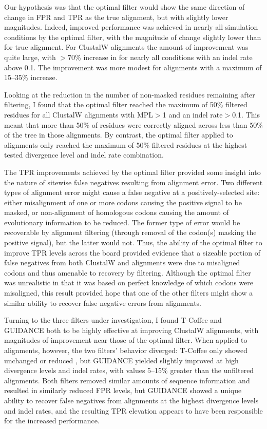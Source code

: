 Our hypothesis was that the optimal filter would show the same
direction of change in FPR and TPR as the true alignment, but with
slightly lower magnitudes. Indeed, improved \sw performance was
achieved in nearly all simulation conditions by the optimal filter,
with the magnitude of \tpr change slightly lower than for true
alignment. For ClustalW alignments the amount of improvement was quite
large, with $>$70\% increase in \tpr for nearly all conditions with an
indel rate above 0.1. The improvement was more modest for \prankc
alignments with a maximum of 15--35\% \tpr increase.

Looking at the reduction in the number of non-masked residues
remaining after filtering, I found that the optimal filter reached
the maximum of 50\% filtered residues for all ClustalW alignments with
MPL$>$1 and an indel rate$>$0.1. This meant that more than 50\% of
residues were correctly aligned across less than 50\% of the tree in
those alignments. By contrast, the optimal filter applied to \prankc
alignments only reached the maximum of 50\% filtered residues at the
highest tested divergence level and indel rate combination.

The TPR improvements achieved by the optimal filter provided some
insight into the nature of sitewise false negatives resulting from
alignment error. Two different types of alignment error might cause a
false negative at a positively-selected site: either misalignment of
one or more \nh codons causing the positive signal to be
masked, or non-alignment of homologous codons causing the amount of
evolutionary information to be reduced. The former type of error would
be recoverable by alignment filtering (through removal of the codon(s)
masking the positive signal), but the latter would not. Thus, the
ability of the optimal filter to improve TPR levels across the board
provided evidence that a sizeable portion of false negatives from both
ClustalW and \prankc alignments were due to misaligned codons and thus
amenable to recovery by filtering. Although the optimal filter was
unrealistic in that it was based on perfect knowledge of which codons
were misaligned, this result provided hope that one of the other
filters might show a similar ability to recover false negative errors
from \prankc alignments.

Turning to the three filters under investigation, I found T-Coffee
and GUIDANCE both to be highly effective at improving ClustalW
alignments, with magnitudes of improvement near those of the optimal
filter. When applied to \prankc alignments, however, the two filters'
behavior diverged: T-Coffee only showed unchanged or reduced \tpr, but
GUIDANCE yielded slightly improved \tpr at high divergence levels and
indel rates, with values 5--15\% greater than the unfiltered \prankc
alignments. Both filters removed similar amounts of sequence
information and resulted in similarly reduced FPR levels, but GUIDANCE
showed a unique ability to recover false negatives from \prankc
alignments at the highest divergence levels and indel rates, and the
resulting TPR elevation appears to have been responsible for the
increased \tpr performance.

